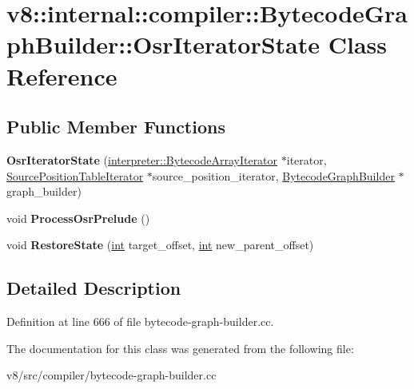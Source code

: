 \hypertarget{classv8_1_1internal_1_1compiler_1_1BytecodeGraphBuilder_1_1OsrIteratorState}{}\section{v8\+:\+:internal\+:\+:compiler\+:\+:Bytecode\+Graph\+Builder\+:\+:Osr\+Iterator\+State Class Reference}
\label{classv8_1_1internal_1_1compiler_1_1BytecodeGraphBuilder_1_1OsrIteratorState}
\subsection*{Public Member Functions}
\begin{DoxyCompactItemize}
\item 
\mbox{\label{classv8_1_1internal_1_1compiler_1_1BytecodeGraphBuilder_1_1OsrIteratorState_a7a520233db2d4ae62cc6421082227c9f}} 
{\bfseries Osr\+Iterator\+State} (\mbox{\hyperlink{classv8_1_1internal_1_1interpreter_1_1BytecodeArrayIterator}{interpreter\+::\+Bytecode\+Array\+Iterator}} $\ast$iterator, \mbox{\hyperlink{classv8_1_1internal_1_1SourcePositionTableIterator}{Source\+Position\+Table\+Iterator}} $\ast$source\+\_\+position\+\_\+iterator, \mbox{\hyperlink{classv8_1_1internal_1_1compiler_1_1BytecodeGraphBuilder}{Bytecode\+Graph\+Builder}} $\ast$graph\+\_\+builder)
\item 
\mbox{\label{classv8_1_1internal_1_1compiler_1_1BytecodeGraphBuilder_1_1OsrIteratorState_a1dfa70a8634c0917f121e7cf48a32f5f}} 
void {\bfseries Process\+Osr\+Prelude} ()
\item 
\mbox{\label{classv8_1_1internal_1_1compiler_1_1BytecodeGraphBuilder_1_1OsrIteratorState_af76d7a78d789044cd8c62b6fcdaeaec3}} 
void {\bfseries Restore\+State} (\mbox{\hyperlink{classint}{int}} target\+\_\+offset, \mbox{\hyperlink{classint}{int}} new\+\_\+parent\+\_\+offset)
\end{DoxyCompactItemize}


\subsection{Detailed Description}


Definition at line 666 of file bytecode-\/graph-\/builder.\+cc.



The documentation for this class was generated from the following file\+:\begin{DoxyCompactItemize}
\item 
v8/src/compiler/bytecode-\/graph-\/builder.\+cc\end{DoxyCompactItemize}
